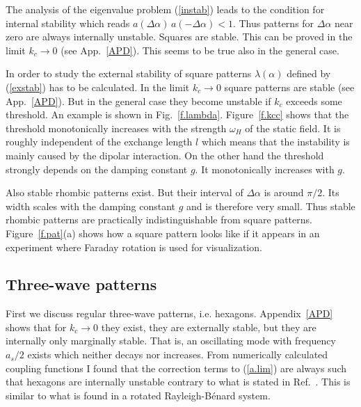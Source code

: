 The analysis of the eigenvalue problem (\ref{instab}) leads to 
the condition for internal stability which reads $a(\Delta\alpha)\, 
a(-\Delta\alpha)<1$. Thus patterns for $\Delta\alpha$ near zero are 
always internally unstable. Squares are stable. This can be proved
in the limit $k_c\to 0$ (see App.~\ref{APD}). This seems to be true 
also in the general case.

In order to study the external stability of square patterns 
$\lambda(\alpha)$ defined by (\ref{exstab}) has to be calculated. In
the limit $k_c\to 0$ square patterns are stable (see App.~\ref{APD}).
But in the general case they become unstable if $k_c$ exceeds some
threshold. An example is shown in Fig.~\ref{f.lambda}. 
Figure~\ref{f.kcc} shows that the threshold monotonically increases
with the strength $\omega_H$ of the static field. It is roughly
independent of the exchange length $l$ which means that the
instability is mainly caused by the dipolar interaction. On the other
hand the threshold strongly depends on the damping constant $g$. It
monotonically increases with $g$.

Also stable rhombic patterns exist. But their interval of
$\Delta\alpha$ is around $\pi/2$. Its width scales with the damping
constant $g$ and is therefore very small. Thus stable rhombic
patterns are practically indistinguishable from square patterns.
Figure~\ref{f.pat}(a) shows how a square pattern looks like if it
appears in an experiment where Faraday rotation is used for
visualization.

\subsection{\protect\label{wave3}Three-wave patterns}

First we discuss regular three-wave patterns, i.e. hexagons. 
Appendix~\ref{APD} shows that for $k_c\to 0$ they exist, they are
externally stable, but they are internally only marginally stable.
That is, an oscillating mode with frequency $a_s/2$ exists which 
neither decays nor increases. From numerically calculated coupling
functions I found that the correction terms to (\ref{a.lim}) are
always such that hexagons are internally unstable contrary to what is
stated in Ref.~\cite{rem8}. This is similar
to what is found in a rotated Rayleigh-B\'enard system\cite{bus.80}.

